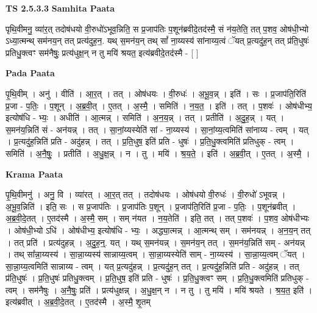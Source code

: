 \documentclass[17pt]{extarticle}
\begin{document}
\textbf{TS 2.5.3.3 } \newline
\textbf{Samhita Paata} \newline

पृथि॒वीमनु॒ व्या॑र॒त् तदोष॑धयो वी॒रुधो॑ऽभूव॒न्निति॒ स प्र॒जाप॑तिः प॒शून॑ब्रवीदे॒तद॑स्मै॒ सं न॑य॒तेति॒ तत् प॒शव॒ ओष॑धी॒भ्यो ऽध्या॒त्मन्थ् सम॑नय॒न् तत् प्रत्य॑दुह॒न॒. यथ् स॒मन॑य॒न् तथ् सां᳚ ना॒य्यस्य॑ सांनाय्य॒त्वं ॅयत् प्र॒त्यदु॑ह॒न् तत् प्र॑ति॒धुषः॑ प्रतिधु॒क्त्वꣳ सम॑नैषुः॒ प्रत्य॑धुक्ष॒न् न तु मयि॑ श्रयत॒ इत्य॑ब्रवीदे॒तद॑स्मै - [  ] \newline

\textbf{Pada Paata} \newline

पृ॒थि॒वीम् । अनु॑ । वीति॑ । आ॒र॒त् । तत् । ओष॑धयः । वी॒रुधः॑ । अ॒भू॒व॒न्न् । इति॑ । सः । प्र॒जाप॑ति॒रिति॑ प्र॒जा - प॒तिः॒ । प॒शून् । अ॒ब्र॒वी॒त् । ए॒तत् । अ॒स्मै॒ । समिति॑ । न॒य॒त॒ । इति॑ । तत् । प॒शवः॑ । ओष॑धीभ्य॒ इत्योष॑धि - भ्यः॒ । अधीति॑ । आ॒त्मन्न् । समिति॑ । अ॒न॒य॒न्न् । तत् । प्रतीति॑ । अ॒दु॒ह॒न्न् । यत् । स॒मन॑य॒न्निति॑ सं - अन॑यन्न् । तत् । सा॒नां॒य्यस्येति॑ सां - ना॒य्यस्य॑ । सा॒नां॒य्य॒त्वमिति॑ सांनाय्य - त्वम् । यत् । प्र॒त्यदु॑ह॒न्निति॑ प्रति - अदु॑हन्न् । तत् । प्र॒ति॒धुष॒ इति॑ प्रति - धुषः॑ । प्र॒ति॒धु॒क्त्वमिति॑ प्रतिधुक् - त्वम् । समिति॑ । अ॒नै॒षुः॒ । प्रतीति॑ । अ॒धु॒क्ष॒न्न् । न । तु । मयि॑ । श्र॒य॒ते॒ । इति॑ । अ॒ब्र॒वी॒त् । ए॒तत् । अ॒स्मै॒ ।  \newline


\textbf{Krama Paata} \newline

पृ॒थि॒वीमनु॑ । अनु॒ वि । व्या॑रत् । आ॒र॒त् तत् । तदोष॑धयः । ओष॑धयो वी॒रुधः॑ । वी॒रुधो॑ ऽभूवन्न् । अ॒भू॒व॒न्निति॑ । इति॒ सः । स प्र॒जाप॑तिः । प्र॒जाप॑तिः प॒शून् । प्र॒जाप॑ति॒रिति॑ प्र॒जा - प॒तिः॒ । प॒शून॑ब्रवीत् । अ॒ब्र॒वी॒दे॒तत् । ए॒तद॑स्मै । अ॒स्मै॒ सम् । सम् न॑यत । न॒य॒तेति॑ । इति॒ तत् । तत् प॒शवः॑ । प॒शव॒ ओष॑धीभ्यः । ओष॑धी॒भ्यो ऽधि॑ । ओष॑धीभ्य॒ इत्योष॑धि - भ्यः॒ । अद्ध्या॒त्मन्न् । आ॒त्मन्थ् सम् । सम॑नयन्न् । अ॒न॒य॒न् तत् । तत् प्रति॑ । प्रत्य॑दुहन्न् । अ॒दु॒ह॒न्॒. यत् । यथ् स॒मन॑यन्न् । स॒मन॑य॒न् तत् । स॒मन॑य॒न्निति॑ सम् - अन॑यन्न् । तथ् सा᳚न्ना॒य्यस्य॑ । सा॒न्ना॒य्यस्य॑ सान्नाय्य॒त्वम् । सा॒न्ना॒य्यस्येति॑ साम् - ना॒य्यस्य॑ । सा॒न्ना॒य्य॒त्वम् ॅयत् । सा॒न्ना॒य्य॒त्वमिति॑ सान्नाय्य - त्वम् । यत् प्र॒त्यदु॑हन्न् । प्र॒त्यदु॑ह॒न् तत् । प्र॒त्यदु॑ह॒न्निति॑ प्रति - अदु॑हन्न् । तत् प्र॑ति॒धुषः॑ । प्र॒ति॒धुषः॑ प्रतिधु॒क्त्वम् । प्र॒ति॒धुष॒ इति॑ प्रति - धुषः॑ । प्र॒ति॒धु॒क्त्वꣳ सम् । प्र॒ति॒धु॒क्त्वमिति॑ प्रतिधुक् - त्वम् । सम॑नैषुः । अ॒नै॒षुः॒ प्रति॑ । प्रत्य॑धुक्षन्न् । अ॒धु॒क्ष॒न् न । न तु । तु मयि॑ । मयि॑ श्रयते । श्र॒य॒त॒ इति॑ । इत्य॑ब्रवीत् । अ॒ब्र॒वी॒दे॒तत् । ए॒तद॑स्मै । अ॒स्मै॒ शृ॒तम् \newline
\end{document}

